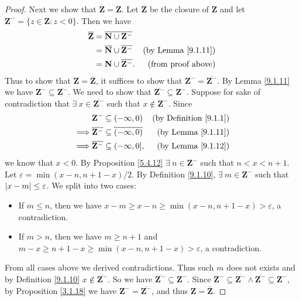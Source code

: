 \begin{proof}
    Next we show that \(\overline{\mathbf{Z}} = \mathbf{Z}\).
    Let \(\overline{\mathbf{Z}}\) be the closure of \(\mathbf{Z}\) and let \(\mathbf{Z}^- = \{z \in \mathbf{Z} : z < 0\}\).
    Then we have
    \begin{align*}
        \overline{\mathbf{Z}} & = \overline{\mathbf{N} \cup \mathbf{Z}^-}                                             \\
                              & = \overline{\mathbf{N}} \cup \overline{\mathbf{Z}^-} & \text{(by Lemma \ref{9.1.11})} \\
                              & = \mathbf{N} \cup \overline{\mathbf{Z}^-}.           & \text{(from proof above)}
    \end{align*}
    Thus to show that \(\mathbf{Z} = \overline{\mathbf{Z}}\), it suffices to show that \(\mathbf{Z}^- = \overline{\mathbf{Z}^-}\).
    By Lemma \ref{9.1.11} we have \(\mathbf{Z}^- \subseteq \overline{\mathbf{Z}^-}\).
    We need to show that \(\overline{\mathbf{Z}^-} \subseteq \mathbf{Z}^-\).
    Suppose for sake of contradiction that \(\exists\ x \in \overline{\mathbf{Z}^-}\) such that \(x \notin \mathbf{Z}^-\).
    Since
    \begin{align*}
                 & \mathbf{Z}^- \subseteq (-\infty, 0)                       & \text{(by Definition \ref{9.1.1})} \\
        \implies & \overline{\mathbf{Z}^-} \subseteq \overline{(-\infty, 0)} & \text{(by Lemma \ref{9.1.11})}     \\
        \implies & \overline{\mathbf{Z}^-} \subseteq (-\infty, 0],           & \text{(by Lemma \ref{9.1.12})}
    \end{align*}
    we know that \(x < 0\).
    By Proposition \ref{5.4.12} \(\exists\ n \in \mathbf{Z}^-\) such that \(n < x < n + 1\).
    Let \(\varepsilon = \min(x - n, n + 1 - x) / 2\).
    By Definition \ref{9.1.10}, \(\exists\ m \in \mathbf{Z}^-\) such that \(\abs*{x - m} \leq \varepsilon\).
    We split into two cases:
    \begin{itemize}
        \item If \(m \leq n\), then we have \(x - m \geq x - n \geq \min(x - n, n + 1 - x) > \varepsilon\), a contradiction.
        \item If \(m > n\), then we have \(m \geq n + 1\) and \(m - x \geq n + 1 - x \geq \min(x - n, n + 1 - x) > \varepsilon\), a contradiction.
    \end{itemize}
    From all cases above we derived contradictions.
    Thus such \(m\) does not exists and by Definition \ref{9.1.10} \(x \notin \overline{\mathbf{Z}^-}\).
    So we have \(\overline{\mathbf{Z}^-} \subseteq \mathbf{Z}^-\).
    Since \(\mathbf{Z}^- \subseteq \overline{\mathbf{Z}^-} \land \overline{\mathbf{Z}^-} \subseteq \mathbf{Z}^-\), by Proposition \ref{3.1.18} we have \(\mathbf{Z}^- = \overline{\mathbf{Z}^-}\), and thus \(\mathbf{Z} = \overline{\mathbf{Z}}\).


\end{proof}
